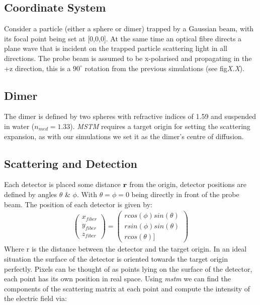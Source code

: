 \subsection{Coordinate System}
Consider a particle (either a sphere or dimer) trapped by
a Gaussian beam, with its focal point being set at [0,0,0]. 
At the same time an optical fibre directs a plane wave that 
is incident on the trapped particle scattering light in all 
directions. The probe beam is assumed to be x-polarised and 
propagating in the +z direction, this is a $90^{\circ}$ 
rotation from the previous simulations (see fig\emph{X.X}). 

\subsection{Dimer}
The dimer is defined by two spheres with refractive indices
of 1.59 and suspended in water ($n_{med} = 1.33$). \textit{MSTM}
requires a target origin for setting the scattering expansion, as
with our simulations we set it as the dimer's centre of diffusion.

\subsection{Scattering and Detection}
Each detector is placed some distance $\bf r$ from the origin, 
detector positions are defined by angles $\theta$ \& $\phi$. With 
$\theta=\phi=0$ being directly in front of the probe beam. The 
position of each detector is given by:
\begin{align}
	\begin{pmatrix}
		x_{fiber} \\ y_{fiber} \\ z_{fiber}
	\end{pmatrix} = 
	\begin{pmatrix}
		rcos(\phi)sin(\theta) \\ rsin(\phi)sin(\theta) \\ rcos(\theta)]
	\end{pmatrix}
\end{align}
Where r is the distance between the detector and the target origin. 
In an ideal situation the surface of the detector is oriented towards 
the target origin perfectly. Pixels can be thought of as points lying 
on the surface of the detector, each point has its own position in real
space. Using \textit{mstm} we can find the components of the scattering 
matrix at each point and compute the intensity of the electric field via:

